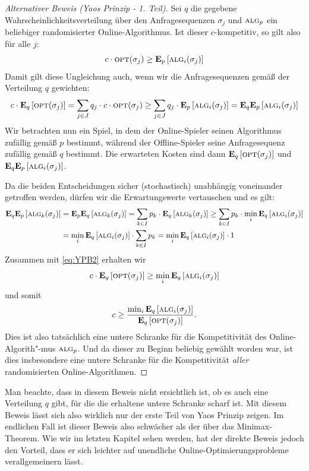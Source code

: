 \documentclass[a4paper,ngerman,12pt,bibtotoc]{scrartcl}
\theoremstyle{definition}
\theoremstyle{plain}
\theoremstyle{remark}
\renewcommand{\_}{\mathpunct{.}\,}
\newcommand{\?}{\,{:}\,}
\newcommand{\Alg}{\ensuremath{\textsc{alg}}}
\newcommand{\Opt}{\ensuremath{\textsc{opt}}}
\newcommand{\EE}{\mathbf{E}}
\begin{document}
	\begin{proof}[Alternativer Beweis (Yaos Prinzip - 1. Teil)]
		Sei $q$ die gegebene Wahrscheinlichkeitsverteilung über den Anfragesequenzen $\sigma_j$ und $\Alg_p$ ein beliebiger randomisierter Online-Algorithmus. Ist dieser $c$-kompetitiv, so gilt also für alle $j$:
			\[c\cdot \Opt(\sigma_j) \geq \EE_p\left[\Alg_i(\sigma_j)\right]\]
		Damit gilt diese Ungleichung auch, wenn wir die Anfragesequenzen gemäß der Verteilung $q$ gewichten:
		\begin{equation}\label{eq:YPB2}
			c\cdot \EE_q\left[\Opt(\sigma_j)\right] = \sum_{j\in J}q_j\cdot c\cdot\Opt(\sigma_j) \geq \sum_{j\in J}q_j\cdot\EE_p\left[\Alg_i(\sigma_j)\right] = \EE_q\EE_p\left[\Alg_i(\sigma_j)\right]
		\end{equation}		
		Wir betrachten nun ein Spiel, in dem der Online-Spieler seinen Algorithmus zufällig gemäß $p$ bestimmt, während der Offline-Spieler seine Anfragesequenz zufällig gemäß $q$ bestimmt. Die erwarteten Kosten sind dann $\EE_q\left[\Opt(\sigma_j)\right]$ und $\EE_q\EE_p\left[\Alg_i(\sigma_j)\right]$.
		
		Da die beiden Entscheidungen sicher (stochastisch) unabhängig voneinander getroffen werden, dürfen wir die Erwartungswerte vertauschen und es gilt:
			\begin{align*}
				\EE_q\EE_p\left[\Alg_k(\sigma_j)\right] &= \EE_p\EE_q\left[\Alg_k(\sigma_j)\right] = \sum_{k \in I} p_k \cdot \EE_q\left[\Alg_k(\sigma_j)\right] \geq \sum_{k \in I} p_k \cdot \min_i\EE_q\left[\Alg_i(\sigma_j)\right] \\
				&= \min_i\EE_q\left[\Alg_i(\sigma_j)\right]\cdot \sum_{k \in I} p_k = \min_i\EE_q\left[\Alg_i(\sigma_j)\right]\cdot 1
			\end{align*}
		Zusammen mit \cref{eq:YPB2} erhalten wir
			\[c \cdot \EE_q\left[\Opt(\sigma_j)\right] \geq \min_i\EE_q\left[\Alg_i(\sigma_j)\right]\]
		und somit
			\[c \geq \frac{\min_i\EE_q\left[\Alg_i(\sigma_j)\right]}{\EE_q\left[\Opt(\sigma_j)\right]}.\]
		Dies ist also tatsächlich eine untere Schranke für die Kompetitivität des Online-Algorith"-mus $\Alg_p$. Und da dieser zu Beginn beliebig gewählt worden war, ist dies insbesondere eine untere Schranke für die Kompetitivität \emph{aller} randomisierten Online-Algorithmen.
	\end{proof}
	
	Man beachte, dass in diesem Beweis nicht ersichtlich ist, ob es auch eine Verteilung $q$ gibt, für die die erhaltene untere Schranke scharf ist. Mit diesem Beweis lässt sich also wirklich nur der erste Teil von Yaos Prinzip zeigen. Im endlichen Fall ist dieser Beweis also schwächer als der über das Minimax-Theorem. Wie wir im letzten Kapitel sehen werden, hat der direkte Beweis jedoch den Vorteil, dass er sich leichter auf unendliche Online-Optimierungsprobleme verallgemeinern lässt.
	
\end{document}
